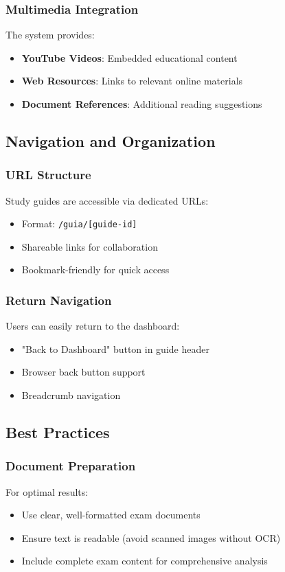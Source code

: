 \documentclass[conference]{IEEEtran}
\begin{document}
\subsubsection{Multimedia Integration}
The system provides:
\begin{itemize}
\item \textbf{YouTube Videos}: Embedded educational content
\item \textbf{Web Resources}: Links to relevant online materials
\item \textbf{Document References}: Additional reading suggestions
\end{itemize}

\subsection{Navigation and Organization}

\subsubsection{URL Structure}
Study guides are accessible via dedicated URLs:
\begin{itemize}
\item Format: \texttt{/guia/[guide-id]}
\item Shareable links for collaboration
\item Bookmark-friendly for quick access
\end{itemize}

\subsubsection{Return Navigation}
Users can easily return to the dashboard:
\begin{itemize}
\item "Back to Dashboard" button in guide header
\item Browser back button support
\item Breadcrumb navigation
\end{itemize}

\subsection{Best Practices}

\subsubsection{Document Preparation}
For optimal results:
\begin{itemize}
\item Use clear, well-formatted exam documents
\item Ensure text is readable (avoid scanned images without OCR)
\item Include complete exam content for comprehensive analysis
\end{itemize}
\end{document}
